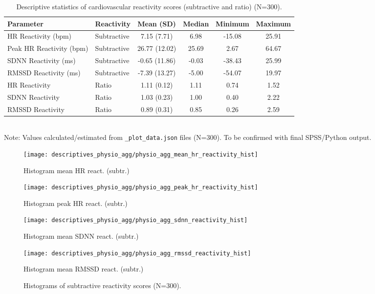 \documentclass[11pt, a4paper]{report}
\begin{document}
\begin{table}[H]
\centering
\caption{Descriptive statistics of cardiovascular reactivity scores (subtractive and ratio) (N=300).}
\label{tab:physio_reactivity_results}
\begin{tabular}{@{}l l c c c c@{}}
\toprule
Parameter                     & Reactivity   & Mean (SD)      & Median  & Minimum & Maximum \\
\midrule
HR Reactivity (bpm)           & Subtractive  & 7.15 (7.71)    & 6.98    & -15.08  & 25.91   \\
Peak HR Reactivity (bpm)      & Subtractive  & 26.77 (12.02)  & 25.69   & 2.67    & 64.67   \\
SDNN Reactivity (ms)          & Subtractive  & -0.65 (11.86)  & -0.03   & -38.43  & 25.99   \\
RMSSD Reactivity (ms)         & Subtractive  & -7.39 (13.27)  & -5.00   & -54.07  & 19.97   \\
HR Reactivity                 & Ratio        & 1.11 (0.12)    & 1.11    & 0.74    & 1.52    \\
SDNN Reactivity               & Ratio        & 1.03 (0.23)    & 1.00    & 0.40    & 2.22    \\
RMSSD Reactivity              & Ratio        & 0.89 (0.31)    & 0.85    & 0.26    & 2.59    \\
\bottomrule
\end{tabular}
\\ \footnotesize{Note: Values calculated/estimated from \texttt{\_plot\_data.json} files (N=300). To be confirmed with final SPSS/Python output.}
\end{table}

\begin{figure}[H]
    \centering
     \begin{minipage}{0.48\textwidth}
        \texttt{[image: descriptives\_physio\_agg/physio\_agg\_mean\_hr\_reactivity\_hist]}
        \caption{Histogram mean HR react. (subtr.)}
        \label{fig:hist_physio_reactivity_start_results}
    \end{minipage}\hfill
    \begin{minipage}{0.48\textwidth}
        \texttt{[image: descriptives\_physio\_agg/physio\_agg\_peak\_hr\_reactivity\_hist]}
        \caption{Histogram peak HR react. (subtr.)}
    \end{minipage}
    \vspace{\floatsep}
    \begin{minipage}{0.48\textwidth}
        \texttt{[image: descriptives\_physio\_agg/physio\_agg\_sdnn\_reactivity\_hist]}
        \caption{Histogram mean SDNN react. (subtr.)}
    \end{minipage}\hfill
    \begin{minipage}{0.48\textwidth}
        \texttt{[image: descriptives\_physio\_agg/physio\_agg\_rmssd\_reactivity\_hist]}
        \caption{Histogram mean RMSSD react. (subtr.)}
        \label{fig:hist_physio_reactivity_end_results}
    \end{minipage}
    \caption{Histograms of subtractive reactivity scores (N=300).}
\end{figure}
\end{document}
